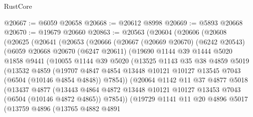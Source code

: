 \begin{lexlean}{RustCore}
\begin{coremodule}
@20667 := @6059 @20658
@20668 := @20612 @8998
@20669 := @5893 @20668
@20670 := @19679 @20660
@20863 := @20563
    (@20604
      (@20606
        (@20608
          (@20625
            (@20641
              (@20653
                (@20666
                  (@20667
                    (@20669 @20670)
                    (@6242 @20543)
                    (@6059
                      @20668
                      @20670
                      (@6247 @20611)
                      (@19690
                        @1144
                        @39
                        @1444
                        @5020
                        @1858
                        @9441
                        (@10055
                          @1144
                          @39
                          @5020
                          (@13525
                            @1143
                            @35
                            @38
                            @4859
                            @5019
                            (@13532
                              @4859
                              (@19707
                                @4847
                                @4854
                                @13448
                                @10121
                                @10127
                                @13545
                                @7043
                                (@6504 (@10146 @4854 @4848))
                                @7854))
                            (@20064
                              @1142
                              @11
                              @37
                              @4877
                              @5018
                              (@13437
                                @4877
                                (@13443
                                  @4864
                                  @4872
                                  @13448
                                  @10121
                                  @10127
                                  @13453
                                  @7043
                                  (@6504 (@10146 @4872 @4865))
                                  @7854))
                              (@19729
                                @1141
                                @11
                                @20
                                @4896
                                @5017
                                (@13759
                                  @4896
                                  (@13765
                                    @4882
                                    @4891

\end{coremodule}
\end{lexlean}
